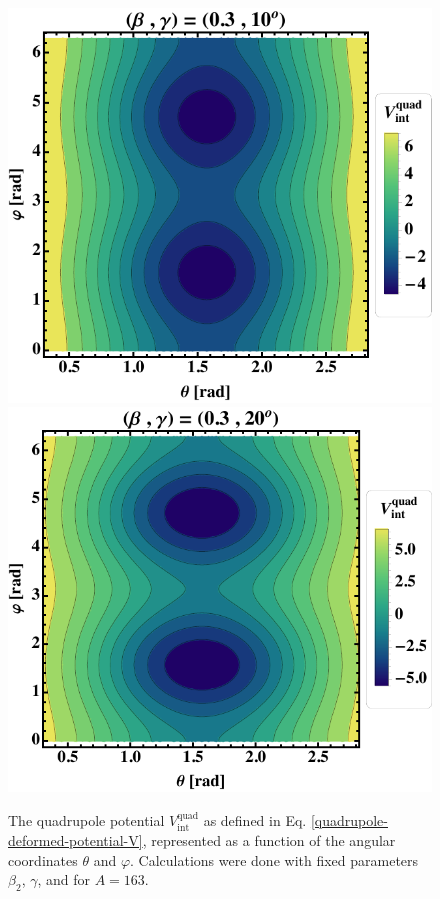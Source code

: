 \begin{figure}
    \centering
    \includegraphics[scale=0.66]{Chapters/Figures/quadrupole-potentialV-1.pdf}
    \includegraphics[scale=0.66]{Chapters/Figures/quadrupole-potentialV-2.pdf}
    \caption{The quadrupole potential $V_\text{int}^\text{quad}$ as defined in Eq. \ref{quadrupole-deformed-potential-V}, represented as a function of the angular coordinates $\theta$ and $\varphi$. Calculations were done with fixed parameters $\beta_2$, $\gamma$, and for $A=163$.}
    \label{figs-deformed-quadrupole-potential-1}
\end{figure}

